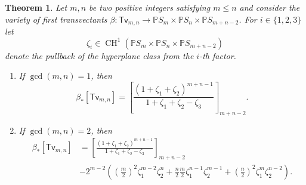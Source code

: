 \documentclass[reqno, 11pt]{amsart}
\theoremstyle{plain}
\newtheorem{theorem}{Theorem}[section]
\theoremstyle{remark}
\renewcommand{\P}{\mathbb{P}}
\DeclareMathOperator{\CH}{CH}
\newcommand{\transvectant}{\mathsf{Tv}}
\begin{document}
\begin{theorem}
    \label{theorem:czvclass} Let $m, n$ be two positive integers satisfying $m \leq n$ and consider the variety of first transvectants $\beta: \transvectant_{m,n} \to \P S_{m} \times \P S_{n} \times \P S_{m+n-2}$. For $i \in \{1,2,3\}$ let $$\zeta_{i} \in \CH^{1}(\P S_{m} \times \P S_{n} \times \P S_{m+n-2})$$ denote the pullback of the hyperplane class from the $i$-th factor. 
    \begin{enumerate}
        \item If $\gcd(m,n) = 1$, then 
        \begin{equation}
            \label{equation:czvclass1}
        \beta_{*}[\transvectant_{m,n}] = \left[\frac{(1+\zeta_{1}+\zeta_{2})^{m+n-1}}{1+\zeta_{1}+\zeta_{2}-\zeta_{3}} \right]_{m+n-2}.
        \end{equation} 
        \item  If $\gcd(m,n) = 2$, then 
        \begin{align}    
            \label{equation:czvclass2}
        \nonumber \beta_{*}[\transvectant_{m,n}] & =  \left[\frac{(1+\zeta_{1}+\zeta_{2})^{m+n-1}}{1+\zeta_{1}+\zeta_{2}-\zeta_{3}} \right]_{m+n-2} \\
        & - 2^{m-2}\left(\left(\frac{m}{2}\right)^{2}\zeta_{1}^{m-2}\zeta_{2}^{n} + \frac{n}{2}\frac{m}{2}\zeta_{1}^{n-1}\zeta_{2}^{m-1} + \left(\frac{n}{2}\right)^{2}\zeta_{1}^{m}\zeta_{2}^{n-2}\right).
        \end{align}    
    \end{enumerate}
    \end{theorem}
    
\end{document}
